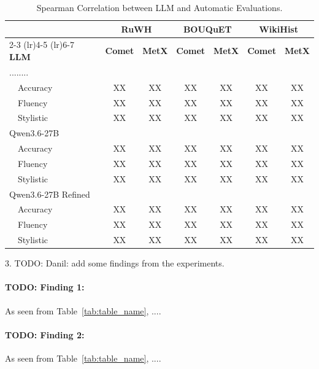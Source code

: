 \documentclass[11pt]{article}
\newcommand{\datasetWikipediaName}{WikiHist}
\newcommand{\datasetEncyclopediaName}{RuWH}
\begin{document}
\begin{table}[t!]
\centering
\begin{tabular}{l cc cc cc}

\toprule
& \multicolumn{2}{c}{\textbf{\datasetEncyclopediaName}} & \multicolumn{2}{c}{\textbf{BOUQuET}} & \multicolumn{2}{c}{\textbf{\datasetWikipediaName}} \\
\cmidrule(lr){2-3} \cmidrule(lr){4-5} \cmidrule(lr){6-7}
\textbf{LLM} & \textbf{Comet} & \textbf{MetX}& \textbf{Comet} & \textbf{MetX} & \textbf{Comet} & \textbf{MetX} \\

\midrule
........ & & & & & & \\
\,\,\,\, Accuracy & XX & XX & XX & XX & XX & XX \\
\,\,\,\, Fluency  & XX & XX & XX & XX & XX & XX \\
\,\,\,\, Stylistic  & XX & XX & XX & XX & XX & XX \\
\midrule
Qwen3.6-27B & & & & & & \\
\,\,\,\, Accuracy & XX & XX & XX & XX & XX & XX \\
\,\,\,\, Fluency  & XX & XX & XX & XX & XX & XX \\
\,\,\,\, Stylistic  & XX & XX & XX & XX & XX & XX \\
\midrule
Qwen3.6-27B Refined & & & & & & \\
\,\,\,\, Accuracy & XX & XX & XX & XX & XX & XX \\
\,\,\,\, Fluency  & XX & XX & XX & XX & XX & XX \\
\,\,\,\, Stylistic  & XX & XX & XX & XX & XX & XX \\

\bottomrule
\end{tabular}
\caption{Spearman Correlation between LLM and Automatic Evaluations.}
\label{tab:spearman_correlation}
\end{table}

3. TODO: Danil: add some findings from the experiments.

\paragraph{TODO: Finding 1:} As seen from Table~\ref{tab:table_name}, ....

\paragraph{TODO: Finding 2:} As seen from Table~\ref{tab:table_name}, ....
\end{document}
